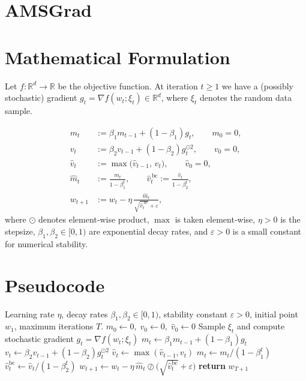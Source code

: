 \documentclass{article}
\begin{document}
\section*{AMSGrad}

\section*{Mathematical Formulation}
Let $f:\mathbb{R}^{d}\rightarrow\mathbb{R}$ be the objective function.  
At iteration $t\ge 1$ we have a (possibly stochastic) gradient $g_{t}=\nabla f(w_{t};\xi_{t})\in\mathbb{R}^{d}$,
where $\xi_{t}$ denotes the random data sample.  

\[
\begin{aligned}
m_{t} &:=\beta_{1}m_{t-1}+(1-\beta_{1})g_{t}, \qquad m_{0}=0,\\[4pt]
v_{t} &:=\beta_{2}v_{t-1}+(1-\beta_{2})g_{t}^{\odot 2}, \qquad v_{0}=0,\\[4pt]
\hat v_{t} &:= \max \bigl(\hat v_{t-1},\,v_{t}\bigr), \qquad \hat v_{0}=0,\\[4pt]
\hat m_{t} &:=\frac{m_{t}}{1-\beta_{1}^{t}},\qquad
\hat v_{t}^{\,\text{bc}}:=\frac{\hat v_{t}}{1-\beta_{2}^{t}},\\[4pt]
w_{t+1} &:= w_{t}-\eta\,\frac{\hat m_{t}}{\sqrt{\hat v_{t}^{\,\text{bc}}}+\varepsilon},
\end{aligned}
\]
where $\odot$ denotes element‑wise product, $\max$ is taken element‑wise,
$\eta>0$ is the stepsize, $\beta_{1},\beta_{2}\in[0,1)$ are exponential decay rates,
and $\varepsilon>0$ is a small constant for numerical stability.

\section*{Pseudocode}
\begin{algorithm}[H]
\caption{AMSGrad}
\begin{algorithmic}[1]
\Require Learning rate $\eta$, decay rates $\beta_{1},\beta_{2}\in[0,1)$,
        stability constant $\varepsilon>0$, initial point $w_{1}$,
        maximum iterations $T$.
\State $m_{0}\gets 0,\; v_{0}\gets 0,\; \hat v_{0}\gets 0$
    \State Sample $\xi_{t}$ and compute stochastic gradient $g_{t}=\nabla f(w_{t};\xi_{t})$
    \State $m_{t}\gets\beta_{1}m_{t-1}+(1-\beta_{1})g_{t}$ 
    \State $v_{t}\gets\beta_{2}v_{t-1}+(1-\beta_{2})g_{t}^{\odot 2}$ 
    \State $\hat v_{t}\gets \max(\hat v_{t-1},v_{t})$ 
    \State $\hat m_{t}\gets m_{t}/(1-\beta_{1}^{t})$ 
    \State $\hat v_{t}^{\text{bc}}\gets \hat v_{t}/(1-\beta_{2}^{t})$
    \State $w_{t+1}\gets w_{t}-\eta\,\hat m_{t}\oslash\bigl(\sqrt{\hat v_{t}^{\text{bc}}}+\varepsilon\bigr)$
\EndFor
\State \textbf{return} $w_{T+1}$
\end{algorithmic}
\end{algorithm}
\end{document}
